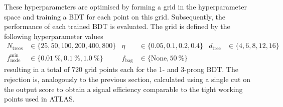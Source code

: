 These hyperparameters are optimised by forming a grid in the hyperparameter
space and training a BDT for each point on this grid. Subsequently, the
performance of each trained BDT is evaluated. The grid is defined by the
following hyperparameter values
\begin{align*}
  N_\mathrm{trees} &\in \{25, 50, 100, 200, 400, 800\} & \eta &\in \{0.05, 0.1, 0.2, 0.4\} & d_\mathrm{tree} &\in \{4, 6, 8, 12, 16\}\\
  f_\mathrm{node}^\mathrm{min} &\in \{\SI{0.01}{\percent}, \SI{0.1}{\percent},\SI{1.0}{\percent}\} & f_\text{bag} &\in \{\text{None}, \SI{50}{\percent} \}
\end{align*}
resulting in a total of 720 grid points each for the 1- and 3-prong BDT. The
rejection is, analogously to the previous section, calculated using a single cut
on the output score to obtain a signal efficiency comparable to the tight
working points used in ATLAS.

